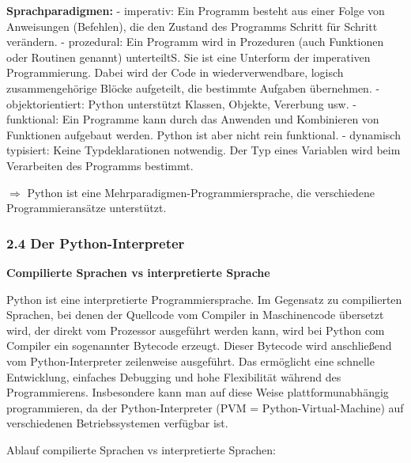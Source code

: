 \documentclass[
  11pt,
  a4paper,
  DIV=11,
  numbers=noendperiod]{scrartcl}
\begin{document}
\textbf{Sprachparadigmen:} - imperativ: Ein Programm besteht aus einer
Folge von Anweisungen (Befehlen), die den Zustand des Programms Schritt
für Schritt verändern. - prozedural: Ein Programm wird in Prozeduren
(auch Funktionen oder Routinen genannt) unterteiltS. Sie ist eine
Unterform der imperativen Programmierung. Dabei wird der Code in
wiederverwendbare, logisch zusammengehörige Blöcke aufgeteilt, die
bestimmte Aufgaben übernehmen. - objektorientiert: Python unterstützt
Klassen, Objekte, Vererbung usw. - funktional: Ein Programme kann durch
das Anwenden und Kombinieren von Funktionen aufgebaut werden. Python ist
aber nicht rein funktional. - dynamisch typisiert: Keine
Typdeklarationen notwendig. Der Typ eines Variablen wird beim
Verarbeiten des Programms bestimmt.

\(\Rightarrow\) Python ist eine Mehrparadigmen-Programmiersprache, die
verschiedene Programmieransätze unterstützt.

\subsubsection{2.4 Der Python-Interpreter}\label{der-python-interpreter}

\textbf{Compilierte Sprachen vs interpretierte Sprache}

Python ist eine interpretierte Programmiersprache. Im Gegensatz zu
compilierten Sprachen, bei denen der Quellcode vom Compiler in
Maschinencode übersetzt wird, der direkt vom Prozessor ausgeführt werden
kann, wird bei Python com Compiler ein sogenannter Bytecode erzeugt.
Dieser Bytecode wird anschließend vom Python-Interpreter zeilenweise
ausgeführt. Das ermöglicht eine schnelle Entwicklung, einfaches
Debugging und hohe Flexibilität während des Programmierens. Insbesondere
kann man auf diese Weise plattformunabhängig programmieren, da der
Python-Interpreter (PVM = Python-Virtual-Machine) auf verschiedenen
Betriebssystemen verfügbar ist.

Ablauf compilierte Sprachen vs interpretierte Sprachen:
\end{document}
